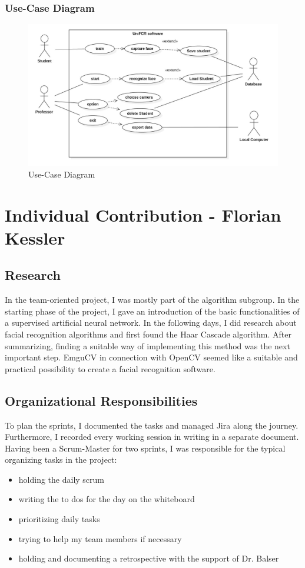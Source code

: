 \documentclass[12pt, a4paper]{article}
\begin{document}
\subsubsection{Use-Case Diagram}
\begin{figure}[H]
		\includegraphics[width=1.2\columnwidth]{images/use_case_diagram}
	\caption{Use-Case Diagram}
	\label{fig:folder}
\end{figure}

\newpage




\section{Individual Contribution -  Florian Kessler}
\subsection{Research}
In the team-oriented project, I was mostly part of the algorithm subgroup. In the starting phase of the project, I gave an introduction of the basic functionalities of a supervised artificial neural network. In the following days, I did research about facial recognition algorithms and first found the Haar Cascade algorithm. After summarizing, finding a suitable way of implementing this method was the next important step. EmguCV in connection with OpenCV seemed like a suitable and practical possibility to create a facial recognition software.
\subsection{Organizational Responsibilities}
 To plan the sprints, I documented the tasks and managed Jira along the journey. Furthermore, I recorded every working session in writing in a separate document. Having been a Scrum-Master for two sprints, I was responsible for the typical organizing tasks in the project:
\begin{itemize}
\item holding the daily scrum
\item writing the to dos for the day on the whiteboard
\item prioritizing daily tasks
\item trying to help my team members if necessary
\item holding and documenting a retrospective with the support of Dr. Balser
\end{itemize}
\end{document}
